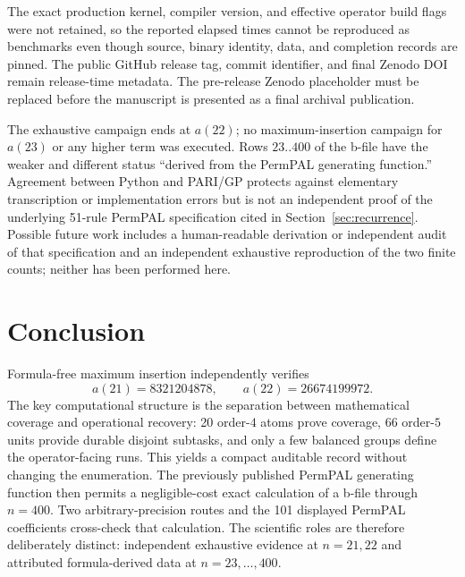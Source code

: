 \documentclass[11pt]{article}
\theoremstyle{definition}
\theoremstyle{remark}
\begin{document}
The exact production kernel, compiler version, and effective operator build
flags were not retained, so the reported elapsed times cannot be reproduced as
benchmarks even though source, binary identity, data, and completion records
are pinned.  The public GitHub release tag, commit identifier, and final
Zenodo DOI remain release-time metadata.  The pre-release Zenodo placeholder
must be replaced before the manuscript is presented as a final archival
publication.

The exhaustive campaign ends at $a(22)$; no maximum-insertion campaign for
$a(23)$ or any higher term was executed.  Rows $23..400$ of the b-file have
the weaker and different status ``derived from the PermPAL generating
function.''  Agreement between Python and PARI/GP protects against elementary
transcription or implementation errors but is not an independent proof of the
underlying 51-rule PermPAL specification cited in
Section~\ref{sec:recurrence}.  Possible future work includes
a human-readable derivation or independent audit of that specification and an
independent exhaustive reproduction of the two finite counts; neither has
been performed here.

\section{Conclusion}
\label{sec:conclusion}

Formula-free maximum insertion independently verifies
\[
 a(21)=8321204878,
 \qquad
 a(22)=26674199972.
\]
The key computational structure is the separation between mathematical
coverage and operational recovery: 20 order-$4$ atoms prove coverage, 66
order-$5$ units provide durable disjoint subtasks, and only a few balanced
groups define the operator-facing runs.  This yields a compact auditable
record without changing the enumeration.  The previously published PermPAL
generating function then permits a negligible-cost exact calculation of a
b-file through $n=400$.  Two arbitrary-precision routes and the 101 displayed
PermPAL coefficients cross-check that calculation.  The scientific roles are
therefore deliberately distinct: independent exhaustive evidence at $n=21,22$
and attributed formula-derived data at $n=23,\ldots,400$.
\end{document}
